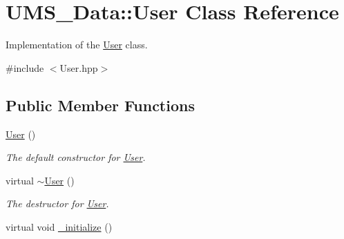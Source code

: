 \hypertarget{classUMS__Data_1_1User}{
\section{UMS\_\-Data::User Class Reference}
\label{classUMS__Data_1_1User}
}


Implementation of the \hyperlink{classUMS__Data_1_1User}{User} class.  




{\ttfamily \#include $<$User.hpp$>$}

\subsection*{Public Member Functions}
\begin{DoxyCompactItemize}
\item 
\hypertarget{classUMS__Data_1_1User_a02a84306ca5a191a9be0eb6a7915a18b}{
\hyperlink{classUMS__Data_1_1User_a02a84306ca5a191a9be0eb6a7915a18b}{User} ()}
\label{classUMS__Data_1_1User_a02a84306ca5a191a9be0eb6a7915a18b}

\begin{DoxyCompactList}\small\item\em The default constructor for \hyperlink{classUMS__Data_1_1User}{User}. \item\end{DoxyCompactList}\item 
\hypertarget{classUMS__Data_1_1User_a27ca168dea11a44927fcc093dd05d0ac}{
virtual \hyperlink{classUMS__Data_1_1User_a27ca168dea11a44927fcc093dd05d0ac}{$\sim$User} ()}
\label{classUMS__Data_1_1User_a27ca168dea11a44927fcc093dd05d0ac}

\begin{DoxyCompactList}\small\item\em The destructor for \hyperlink{classUMS__Data_1_1User}{User}. \item\end{DoxyCompactList}\item 
\hypertarget{classUMS__Data_1_1User_ac26fac31dc93eb320bcf720cb7c2fcfb}{
virtual void \hyperlink{classUMS__Data_1_1User_ac26fac31dc93eb320bcf720cb7c2fcfb}{\_\-initialize} ()}
\label{classUMS__Data_1_1User_ac26fac31dc93eb320bcf720cb7c2fcfb}


\end{DoxyCompactItemize}
